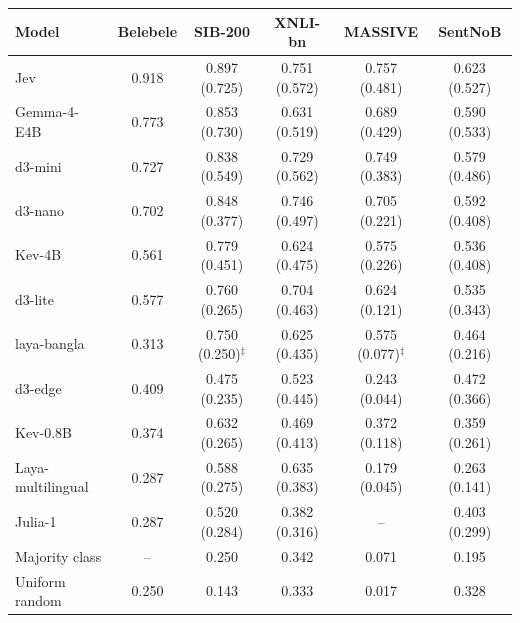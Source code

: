 \begin{tabular}{@{}lccccc@{}}\toprule
Model & Belebele & SIB-200 & XNLI-bn & MASSIVE & SentNoB \\\midrule
Jev & 0.918 & 0.897 (0.725) & 0.751 (0.572) & 0.757 (0.481) & 0.623 (0.527) \\
Gemma-4-E4B & 0.773 & 0.853 (0.730) & 0.631 (0.519) & 0.689 (0.429) & 0.590 (0.533) \\
d3-mini & 0.727 & 0.838 (0.549) & 0.729 (0.562) & 0.749 (0.383) & 0.579 (0.486) \\
d3-nano & 0.702 & 0.848 (0.377) & 0.746 (0.497) & 0.705 (0.221) & 0.592 (0.408) \\
Kev-4B & 0.561 & 0.779 (0.451) & 0.624 (0.475) & 0.575 (0.226) & 0.536 (0.408) \\
d3-lite & 0.577 & 0.760 (0.265) & 0.704 (0.463) & 0.624 (0.121) & 0.535 (0.343) \\
laya-bangla & 0.313 & 0.750 (0.250)$^\ddagger$ & 0.625 (0.435) & 0.575 (0.077)$^\ddagger$ & 0.464 (0.216) \\
d3-edge & 0.409 & 0.475 (0.235) & 0.523 (0.445) & 0.243 (0.044) & 0.472 (0.366) \\
Kev-0.8B & 0.374 & 0.632 (0.265) & 0.469 (0.413) & 0.372 (0.118) & 0.359 (0.261) \\
Laya-multilingual & 0.287 & 0.588 (0.275) & 0.635 (0.383) & 0.179 (0.045) & 0.263 (0.141) \\
Julia-1 & 0.287 & 0.520 (0.284) & 0.382 (0.316) & -- & 0.403 (0.299) \\
\midrule
Majority class & -- & 0.250 & 0.342 & 0.071 & 0.195 \\
Uniform random & 0.250 & 0.143 & 0.333 & 0.017 & 0.328 \\
\bottomrule\end{tabular}
